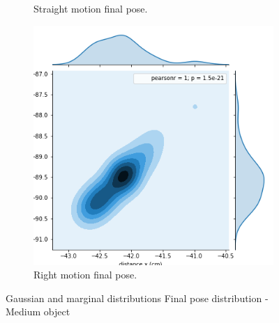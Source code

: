 \begin{figure}[ht!]
\begin{subfigure}[b]{0.3\textwidth}
		\caption{Straight motion final pose.}
		\label{distribution-right-turn}
	\end{subfigure}
	\qquad
	\begin{subfigure}[b]{0.3\textwidth}
		\includegraphics[width=\textwidth]{images/medium_right.png}
		\caption{Right motion final pose.}
		\label{distribution-straight-motion}
	\end{subfigure}
	\caption{Gaussian and marginal distributions Final pose distribution - Medium object}
\end{figure}


